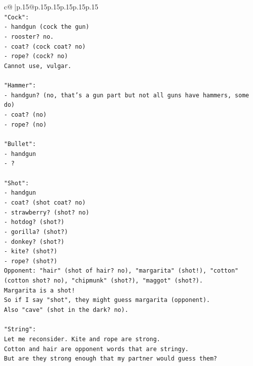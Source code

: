 \documentclass{article}
\begin{document}
{\begin{supertabular}{c@{$\;$}|p{.15\linewidth}@{}p{.15\linewidth}p{.15\linewidth}p{.15\linewidth}p{.15\linewidth}p{.15\linewidth}}
{{{\\ 
\texttt{"Cock":} \\
\texttt{{-} handgun (cock the gun)} \\
\texttt{{-} rooster? no.} \\
\texttt{{-} coat? (cock coat? no)} \\
\texttt{{-} rope? (cock? no)} \\
\texttt{Cannot use, vulgar.} \\
\\ 
\texttt{"Hammer":} \\
\texttt{{-} handgun? (no, that's a gun part but not all guns have hammers, some do)} \\
\texttt{{-} coat? (no)} \\
\texttt{{-} rope? (no)} \\
\\ 
\texttt{"Bullet":} \\
\texttt{{-} handgun} \\
\texttt{{-} ?} \\
\\ 
\texttt{"Shot":} \\
\texttt{{-} handgun} \\
\texttt{{-} coat? (shot coat? no)} \\
\texttt{{-} strawberry? (shot? no)} \\
\texttt{{-} hotdog? (shot?)} \\
\texttt{{-} gorilla? (shot?)} \\
\texttt{{-} donkey? (shot?)} \\
\texttt{{-} kite? (shot?)} \\
\texttt{{-} rope? (shot?)} \\
\texttt{Opponent: "hair" (shot of hair? no), "margarita" (shot!), "cotton" (cotton shot? no), "chipmunk" (shot?), "maggot" (shot?).} \\
\texttt{Margarita is a shot!} \\
\texttt{So if I say "shot", they might guess margarita (opponent).} \\
\texttt{Also "cave" (shot in the dark? no).} \\
\\ 
\texttt{"String":} \\
\texttt{Let me reconsider. Kite and rope are strong.} \\
\texttt{Cotton and hair are opponent words that are stringy.} \\
\texttt{But are they strong enough that my partner would guess them?} \\
}}}
\end{supertabular}}
\end{document}
